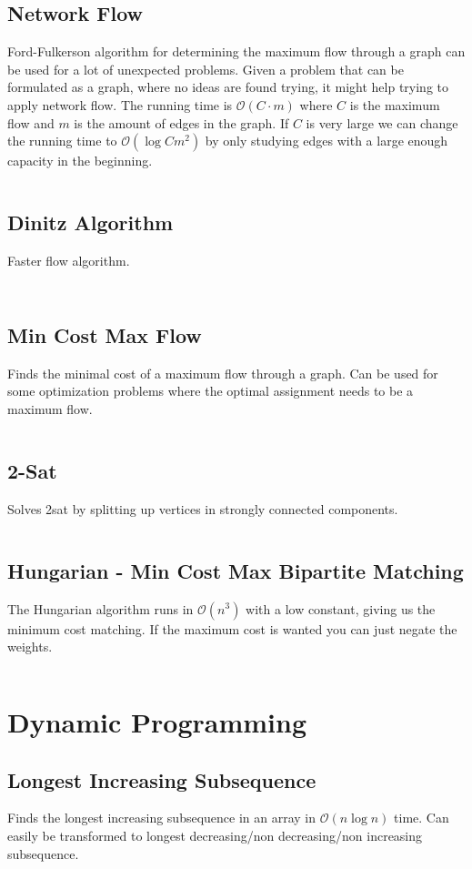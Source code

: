 \documentclass[8pt,a4paper,landscape,oneside]{amsart}
\newcommand{\codej}[1]{\inputminted[fontsize=\large,tabsize=2,baselinestretch=1]{java}{src/#1}}
\newcommand{\codec}[1]{\inputminted[fontsize=\large,tabsize=2,baselinestretch=1]{cpp}{src/#1}}
\newcommand{\codep}[1]{\inputminted[fontsize=\large,tabsize=2,baselinestretch=1]{py}{src/#1}}
\newcommand{\bigO}{\mathcal{O}}
\begin{document}
\begin{multicols*}{2}
\begin{large}
    \subsection{Network Flow}
        Ford-Fulkerson algorithm for determining the maximum flow through a graph can be used for a lot of unexpected problems. Given a problem that can be formulated as a graph, where no ideas are found trying, it might help trying to apply network flow. The running time is $\bigO (C \cdot m)$ where $C$ is the maximum flow and $m$ is the amount of edges in the graph.
        If $C$ is very large we can change the running time to $\bigO (\log{C}m^2)$ by only studying edges with a large enough capacity in the beginning.
        \codep{graphs/flow.py}
    \subsection{Dinitz Algorithm}
    Faster flow algorithm.
        \codep{graphs/dinitz.py}
        \codec{graphs/dinic.cpp}
    \subsection{Min Cost Max Flow}
        Finds the minimal cost of a maximum flow through a graph.
        Can be used for some optimization problems where the optimal assignment needs to be a maximum flow.
        \codej{graphs/MinCostMaxFlow.java}
    \subsection{2-Sat}
        Solves 2sat by splitting up vertices in strongly connected components.
        \codep{graphs/TwoSat.py}
    \subsection{Hungarian - Min Cost Max Bipartite Matching}
        The Hungarian algorithm runs in $\bigO(n^3)$ with a low constant, giving us the minimum cost matching. If the maximum cost is wanted you can just negate the weights.
        \codec{graphs/hungarian.py}

\section{Dynamic Programming}
    \subsection{Longest Increasing Subsequence}
        Finds the longest increasing subsequence in an array in $\bigO(n \log{n})$ time. Can easily be transformed to longest decreasing/non decreasing/non increasing subsequence.
        \codej{dynamicprogramming/lis.py}

\end{large}
\end{multicols*}
\end{document}
